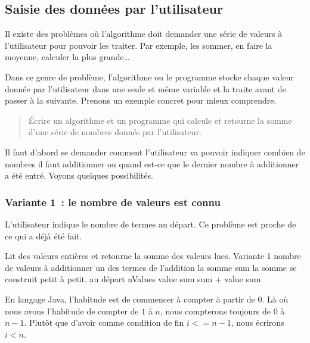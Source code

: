 \subsection{Saisie des données par l'utilisateur}

	Il existe des problèmes où l’algorithme doit demander une série de valeurs
	à l’utilisateur pour pouvoir les traiter.  Par exemple, les sommer, en faire
	la moyenne, calculer la plus grande\dots
	
	Dans ce genre de problème, l'algorithme ou le programme stocke chaque valeur
	donnée par l’utilisateur dans une seule et même variable et la traite avant
	de passer à la suivante.  Prenons un exemple concret pour mieux comprendre.

	\begin{quote}
	Écrire un algorithme et un programme qui calcule et retourne 
	la somme d’une série de nombres donnés par l’utilisateur. 
	\end{quote}

	Il faut d’abord se demander comment l’utilisateur va pouvoir indiquer
	combien de nombres il faut additionner ou quand est-ce que le dernier nombre
	à additionner a été entré.  Voyons quelques possibilités.
	

	\subsubsection{Variante 1~: le nombre de valeurs est connu} 
	
		L’utilisateur indique le nombre de termes au départ.
		Ce problème est proche de ce qui a déjà été fait.
		
		\begin{pseudocode}
		\LComment Lit des valeurs entières et retourne la somme des valeurs lues.
		 \RComment Variante 1
			 \RComment nombre de valeurs à additionner
			 \RComment un des termes de l’addition
			 \RComment la somme
			\Let sum  \RComment la somme se construit petit à petit. 
					\Let{} au départ
			\Read nValues
				\Read value
				\Let sum \Gets sum + value 
			\EndFor
			\Return sum
		\EndAlgo
		\end{pseudocode}

		En langage Java, l'habitude est de commencer à compter à partir de 0. Là
		où nous avons l'habitude de compter de $1$ à $n$, nous compterons
		toujours de $0$ à $n-1$. Plutôt que d'avoir comme condition de fin
		$i <= n - 1$, nous écrirons $i < n$.

